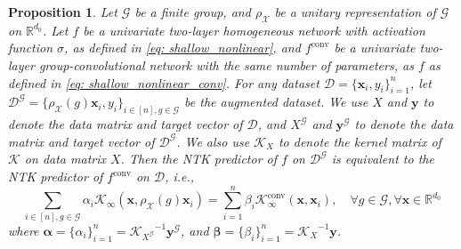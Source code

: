 \documentclass{article}
\newcommand{\G}{\mathcal{G}}
\newcommand{\X}{\mathcal{X}}
\theoremstyle{plain}
\newtheorem{proposition}[theorem]{Proposition}
\theoremstyle{definition}
\theoremstyle{remark}
\theoremstyle{remark}
\begin{document}
\begin{proposition}
  Let $\G$ be a finite group, and $\rho_{\X}$ be a unitary representation of $\G$ on $\mathbb{R}^{d_0}$. Let $f$ be a univariate two-layer homogeneous network with activation function $\sigma$, as defined in \cref{eq: shallow_nonlinear}, and $f^{\text{conv}}$ be a univariate two-layer group-convolutional network with the same number of parameters, as $f$ as defined in \cref{eq: shallow_nonlinear_conv}.
  For any dataset $\mathcal{D} = \{\mathbf{x}_i, y_i\}_{i=1}^{n}$, let $\mathcal{D}^{\G} = \{\rho_{\X}(g) \mathbf{x}_i, y_i\}_{i \in [n], g \in \G}$ be the augmented dataset.
  We use $X$ and $\mathbf{y}$ to denote the data matrix and target vector of $\mathcal{D}$, and $X^{\G}$ and $\mathbf{y}^{\G}$ to denote the data matrix and target vector of $\mathcal{D}^{\G}$.
  We also use $\mathcal{K}_{X}$ to denote the kernel matrix of $\mathcal{K}$ on data matrix $X$.
  Then the NTK predictor of $f$ on $\mathcal{D}^{\G}$ is equivalent to the NTK predictor of $f^{\text{conv}}$ on $\mathcal{D}$, i.e.,
  \[
  \sum_{i \in [n], g \in \G} \alpha_i \mathcal{K}_{\infty}(\mathbf{x}, \rho_{\X}(g) \mathbf{x}_i) = \sum_{i=1}^{n} \beta_i \mathcal{K}_{\infty}^{\text{conv}}(\mathbf{x}, \mathbf{x}_i), \quad \forall g \in \G, \forall \mathbf{x} \in \mathbb{R}^{d_0}
  \]
  where $\boldsymbol{\alpha} = \{\alpha_i\}_{i=1}^{n} = {\mathcal{K}_{X^{\G}}}^{-1} \mathbf{y}^{\G}$, and $\boldsymbol{\beta} = \{\beta_i\}_{i=1}^{n} = {\mathcal{K}_{X}}^{-1} \mathbf{y}$.
\end{proposition}
\end{document}
